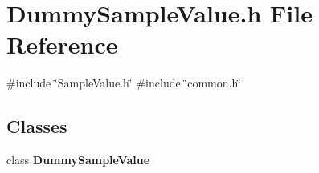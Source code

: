 \section{Dummy\+Sample\+Value.\+h File Reference}
\label{DummySampleValue_8h}
{\ttfamily \#include \char`\"{}Sample\+Value.\+h\char`\"{}}\newline
{\ttfamily \#include \char`\"{}common.\+h\char`\"{}}\newline
\subsection*{Classes}
\begin{DoxyCompactItemize}
\item 
class \textbf{ Dummy\+Sample\+Value}
\end{DoxyCompactItemize}
